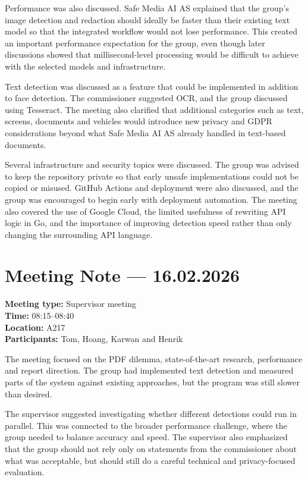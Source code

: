 Performance was also discussed. Safe Media AI AS explained that the group's image detection and redaction should ideally be faster than their existing text model so that the integrated workflow would not lose performance. This created an important performance expectation for the group, even though later discussions showed that millisecond-level processing would be difficult to achieve with the selected models and infrastructure.

Text detection was discussed as a feature that could be implemented in addition to face detection. The commissioner suggested OCR, and the group discussed using Tesseract. The meeting also clarified that additional categories such as text, screens, documents and vehicles would introduce new privacy and GDPR considerations beyond what Safe Media AI AS already handled in text-based documents.

Several infrastructure and security topics were discussed. The group was advised to keep the repository private so that early unsafe implementations could not be copied or misused. GitHub Actions and deployment were also discussed, and the group was encouraged to begin early with deployment automation. The meeting also covered the use of Google Cloud, the limited usefulness of rewriting API logic in Go, and the importance of improving detection speed rather than only changing the surrounding API language.

\section{Meeting Note --- 16.02.2026}
\label{app:meeting-2026-02-16}
\textbf{Meeting type:} Supervisor meeting\\
\textbf{Time:} 08:15--08:40\\
\textbf{Location:} A217\\
\textbf{Participants:} Tom, Hoang, Karwan and Henrik

The meeting focused on the PDF dilemma, state-of-the-art research, performance and report direction. The group had implemented text detection and measured parts of the system against existing approaches, but the program was still slower than desired.

The supervisor suggested investigating whether different detections could run in parallel. This was connected to the broader performance challenge, where the group needed to balance accuracy and speed. The supervisor also emphasized that the group should not rely only on statements from the commissioner about what was acceptable, but should still do a careful technical and privacy-focused evaluation.

